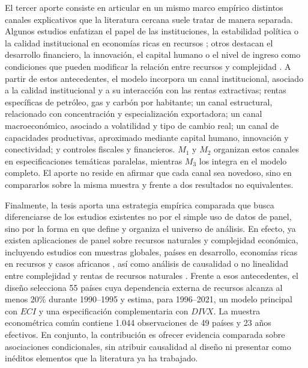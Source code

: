 \documentclass[../../TFM.tex]{subfiles}
\begin{document}
	El tercer aporte consiste en articular en un mismo marco empírico distintos canales explicativos que la literatura cercana suele tratar de manera separada. Algunos estudios enfatizan el papel de las instituciones, la estabilidad política o la calidad institucional en economías ricas en recursos \parencite{Ajide2022,Avom2022,Olaniyi-Odhiambo2025-3,Olaniyi-Odhiambo2025,Owjimehr2024}; otros destacan el desarrollo financiero, la innovación, el capital humano o el nivel de ingreso como condiciones que pueden modificar la relación entre recursos y complejidad \parencite{Alvarado2023,Li2024,Valentine2024}. A partir de estos antecedentes, el modelo incorpora un canal institucional, asociado a la calidad institucional y a su interacción con las rentas extractivas; rentas específicas de petróleo, gas y carbón por habitante; un canal estructural, relacionado con concentración y especialización exportadora; un canal macroeconómico, asociado a volatilidad y tipo de cambio real; un canal de capacidades productivas, aproximado mediante capital humano, innovación y conectividad; y controles fiscales y financieros. $M_1$ y $M_2$ organizan estos canales en especificaciones temáticas paralelas, mientras $M_3$ los integra en el modelo completo. El aporte no reside en afirmar que cada canal sea novedoso, sino en compararlos sobre la misma muestra y frente a dos resultados no equivalentes.

	Finalmente, la tesis aporta una estrategia empírica comparada que busca diferenciarse de los estudios existentes no por el simple uso de datos de panel, sino por la forma en que define y organiza el universo de análisis. En efecto, ya existen aplicaciones de panel sobre recursos naturales y complejidad económica, incluyendo estudios con muestras globales, países en desarrollo, economías ricas en recursos y casos africanos \parencite{Ajide2022,Avom2022,Owjimehr2024,Valentine2024,Zhang2023}, así como análisis de causalidad o no linealidad entre complejidad y rentas de recursos naturales \parencite{Olaniyi-Odhiambo2025-2,Ul-Durar2023}. Frente a esos antecedentes, el diseño selecciona 55 países cuya dependencia externa de recursos alcanza al menos 20\% durante 1990--1995 y estima, para 1996--2021, un modelo principal con $ECI$ y una especificación complementaria con $DIVX$. La muestra econométrica común contiene 1.044 observaciones de 49 países y 23 años efectivos. En conjunto, la contribución es ofrecer evidencia comparada sobre asociaciones condicionales, sin atribuir causalidad al diseño ni presentar como inéditos elementos que la literatura ya ha trabajado.

\end{document}

